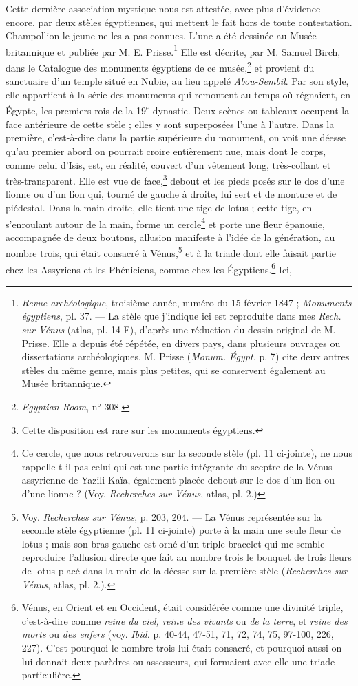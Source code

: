 \documentclass{article}
\begin{document}
Cette dernière association mystique nous est attestée, avec plus d'évidence encore, par deux stèles égyptiennes, qui mettent le fait hors de toute contestation. Champollion le jeune ne les a pas connues. L'une a été dessinée au Musée britannique et publiée par M. E. Prisse.\footnote{\emph{Revue archéologique}, troisième année, numéro du 15 février 1847 ; \emph{Monuments égyptiens}, pl. 37. --- La stèle que j'indique ici est reproduite dans mes \emph{Rech. sur Vénus} (atlas, pl. 14 F), d'après une réduction du dessin original de M. Prisse. Elle a depuis été répétée, en divers pays, dans plusieurs ouvrages ou dissertations archéologiques. M. Prisse (\emph{Monum. Égypt.} p. 7) cite deux antres stèles du même genre, mais plus petites, qui se conservent également au Musée britannique.} Elle est décrite, par M. Samuel Birch, dans le Catalogue des monuments égyptiens de ce musée,\footnote{\emph{Egyptian Room}, n° 308.} et provient du sanctuaire d'un temple situé en Nubie, au lieu appelé \emph{Abou-Sembil}. Par son style, elle appartient à la série des monuments qui remontent au temps où régnaient, en Égypte, les premiers rois de la 19\textsuperscript{e} dynastie. Deux scènes ou tableaux occupent la face antérieure de cette stèle ; elles y sont superposées l'une à l'autre. Dans la première, c'est-à-dire dans la partie supérieure du monument, on voit une déesse qu'au premier abord on pourrait croire entièrement nue, mais dont le corps, comme celui d'Isis, est, en réalité, couvert d'un vêtement long, très-collant et très-transparent. Elle est vue de face,\footnote{Cette disposition est rare sur les monuments égyptiens.} debout et les pieds posés sur le dos d'une lionne ou d'un lion qui, tourné de gauche à droite, lui sert et de monture et de piédestal. Dans la main droite, elle tient une tige de lotus ; cette tige, en s'enroulant autour de la main, forme un cercle\footnote{Ce cercle, que nous retrouverons sur la seconde stèle (pl. 11 ci-jointe), ne nous rappelle-t-il pas celui qui est une partie intégrante du sceptre de la Vénus assyrienne de Yazili-Kaïa, également placée debout sur le dos d'un lion ou d'une lionne ? (Voy. \emph{Recherches sur Vénus}, atlas, pl. 2.)} et porte une fleur épanouie, accompagnée de deux boutons, allusion manifeste à l'idée de la génération, au nombre trois, qui était consacré à Vénus,\footnote{Voy. \emph{Recherches sur Vénus}, p. 203, 204. --- La Vénus représentée sur la seconde stèle égyptienne (pl. 11 ci-jointe) porte à la main une seule fleur de lotus ; mais son bras gauche est orné d'un triple bracelet qui me semble reproduire l'allusion directe que fait au nombre trois le bouquet de trois fleurs de lotus placé dans la main de la déesse sur la première stèle (\emph{Recherches sur Vénus}, atlas, pl. 2.).} et à la triade dont elle faisait partie chez les Assyriens et les Phéniciens, comme chez les Égyptiens.\footnote{Vénus, en Orient et en Occident, était considérée comme une divinité triple, c'est-à-dire comme \emph{reine du ciel, reine des vivants} ou \emph{de la terre}, et \emph{reine des morts} ou \emph{des enfers} (voy. \emph{Ibid.} p. 40-44, 47-51, 71, 72, 74, 75, 97-100, 226, 227). C'est pourquoi le nombre trois lui était consacré, et pourquoi aussi on lui donnait deux parèdres ou assesseurs, qui formaient avec elle une triade particulière.} Ici, 
\end{document}
